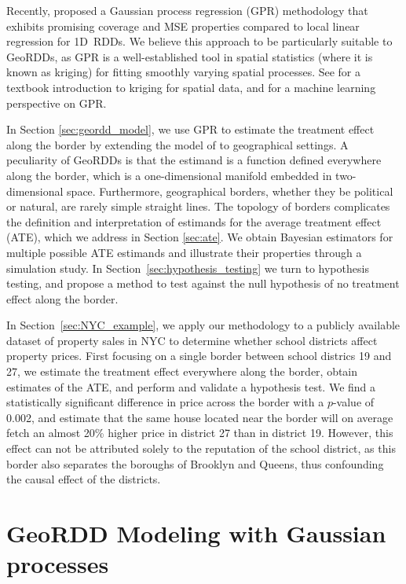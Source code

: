\documentclass[letter,12pt]{article}
\begin{document}
Recently, \cite{Branson:2017qy} proposed a Gaussian process regression (GPR) methodology that exhibits promising coverage and MSE properties compared to local linear regression for 1D~RDDs.
We believe this approach to be particularly suitable to GeoRDDs, as GPR is a well-established tool in spatial statistics (where it is known as kriging) for fitting smoothly varying spatial processes.
See \cite{banerjee2014hierarchical} for a textbook introduction to kriging for spatial data, and \cite{rasmussen2006gaussian} for a machine learning perspective on GPR.



In Section \ref{sec:geordd_model}, we use GPR to estimate the treatment effect along the border by extending the model of \cite{Branson:2017qy} to geographical settings.
A peculiarity of GeoRDDs is that the estimand is a function defined everywhere along the border, which is a one-dimensional manifold embedded in two-dimensional space.
Furthermore, geographical borders, whether they be political or natural, are rarely simple straight lines.
The topology of borders complicates the definition and interpretation of estimands for the average treatment effect (ATE), which we address in Section \ref{sec:ate}.
We obtain Bayesian estimators for multiple possible ATE estimands and illustrate their properties through a simulation study.
In Section~\ref{sec:hypothesis_testing} we turn to hypothesis testing, and propose a method to test against the null hypothesis of no treatment effect along the border.

In Section~\ref{sec:NYC_example}, we apply our methodology to a publicly available dataset of property sales in NYC to determine whether school districts affect property prices.
First focusing on a single border between school districs 19 and 27, we estimate the treatment effect everywhere along the border, obtain estimates of the ATE, and perform and validate a hypothesis test.
We find a statistically significant difference in price across the border with a \(p\)-value of 0.002, and estimate that the same house located near the border will on average fetch an almost 20\% higher price in district 27 than in district 19.
However, this effect can not be attributed solely to the reputation of the school district, as this border also separates the boroughs of Brooklyn and Queens, thus confounding the causal effect of the districts.

\hypertarget{geordd-modeling-with-gaussian-processes}{%
\section{GeoRDD Modeling with Gaussian processes}\label{geordd-modeling-with-gaussian-processes}}
\end{document}
